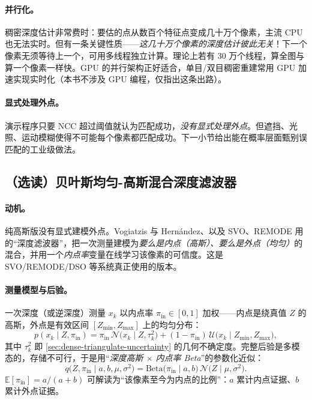\paragraph{并行化。}
稠密深度估计非常费时：要估的点从数百个特征点变成几十万个像素，主流 CPU 也无法实时。但有一条关键性质——\emph{这几十万个像素的深度估计彼此无关}！下一个像素无须等待上一个，可用多线程独立计算。理论上若有 30 万个线程，算全图与算一个像素一样快。GPU 的并行架构正好适合，单目/双目稠密重建常用 GPU 加速实现实时化（本书不涉及 GPU 编程，仅指出这条出路）。

\paragraph{显式处理外点。}
演示程序只要 NCC 超过阈值就认为匹配成功，\emph{没有显式处理外点}。但遮挡、光照、运动模糊使得不可能每个像素都匹配成功。下一小节给出能在概率层面甄别误匹配的工业级做法。

\subsection{（选读）贝叶斯均匀-高斯混合深度滤波器}
\label{sec:dense-bayes-filter}

\paragraph{动机。}
纯高斯版没有显式建模外点。Vogiatzis 与 Hernández\cite{vogiatzis2011video}、以及 SVO\cite{forster2017svo}、REMODE\cite{pizzoli2014remode} 用的“深度滤波器”，把一次测量建模为\emph{要么是内点（高斯）、要么是外点（均匀）}的混合，并用一个\emph{内点率}变量在线学习该像素的可信度。这是 SVO/REMODE/DSO 等系统真正使用的版本。

\paragraph{测量模型与后验。}
一次深度（或逆深度）测量 $x_k$ 以内点率 $\pi_{\mathrm{in}}\in[0,1]$ 加权——内点是绕真值 $Z$ 的高斯，外点是有效区间 $[Z_{\min},Z_{\max}]$ 上的均匀分布：
\begin{equation}
  p(x_k\mid Z,\pi_{\mathrm{in}})=\pi_{\mathrm{in}}\,\mathcal{N}\!\bigl(x_k\mid Z,\tau_k^2\bigr)
   +(1-\pi_{\mathrm{in}})\,\mathcal{U}\!\bigl(x_k\mid Z_{\min},Z_{\max}\bigr),
  \label{eq:dense-mix}
\end{equation}
其中 $\tau_k^2$ 即 \cref{sec:dense-triangulate-uncertainty} 的几何不确定度。完整后验是多模态的，存储不可行，于是用“\emph{深度高斯 $\times$ 内点率 Beta}”的参数化近似：
\begin{equation}
  q\!\bigl(Z,\pi_{\mathrm{in}}\mid a,b,\mu,\sigma^2\bigr)=\mathrm{Beta}\!\bigl(\pi_{\mathrm{in}}\mid a,b\bigr)\,\mathcal{N}\!\bigl(Z\mid\mu,\sigma^2\bigr).
  \label{eq:dense-gaussbeta}
\end{equation}
$\mathbb{E}[\pi_{\mathrm{in}}]=a/(a+b)$ 可解读为“该像素至今为内点的比例”：$a$ 累计内点证据、$b$ 累计外点证据。

